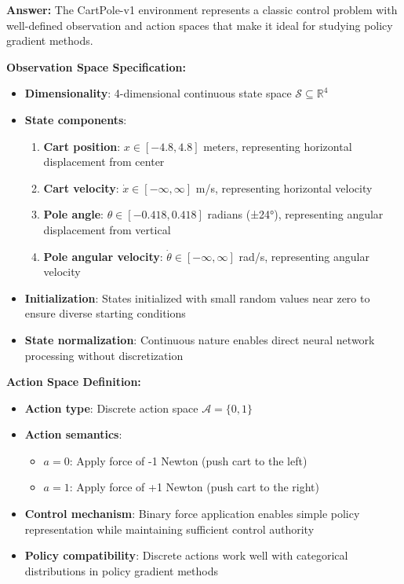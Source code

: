 \documentclass[12pt]{article}
\begin{document}
{{{\textbf{Answer:} The CartPole-v1 environment represents a classic control problem with well-defined observation and action spaces that make it ideal for studying policy gradient methods.

\textbf{Observation Space Specification:}
\begin{itemize}
    \item \textbf{Dimensionality}: 4-dimensional continuous state space $\mathcal{S} \subseteq \mathbb{R}^4$
    \item \textbf{State components}:
    \begin{enumerate}
        \item \textbf{Cart position}: $x \in [-4.8, 4.8]$ meters, representing horizontal displacement from center
        \item \textbf{Cart velocity}: $\dot{x} \in [-\infty, \infty]$ m/s, representing horizontal velocity
        \item \textbf{Pole angle}: $\theta \in [-0.418, 0.418]$ radians (±24°), representing angular displacement from vertical
        \item \textbf{Pole angular velocity}: $\dot{\theta} \in [-\infty, \infty]$ rad/s, representing angular velocity
    \end{enumerate}
    \item \textbf{Initialization}: States initialized with small random values near zero to ensure diverse starting conditions
    \item \textbf{State normalization}: Continuous nature enables direct neural network processing without discretization
\end{itemize}

\textbf{Action Space Definition:}
\begin{itemize}
    \item \textbf{Action type}: Discrete action space $\mathcal{A} = \{0, 1\}$
    \item \textbf{Action semantics}: 
    \begin{itemize}
        \item $a = 0$: Apply force of -1 Newton (push cart to the left)
        \item $a = 1$: Apply force of +1 Newton (push cart to the right)
    \end{itemize}
    \item \textbf{Control mechanism}: Binary force application enables simple policy representation while maintaining sufficient control authority
    \item \textbf{Policy compatibility}: Discrete actions work well with categorical distributions in policy gradient methods
\end{itemize}

}}}
\end{document}
